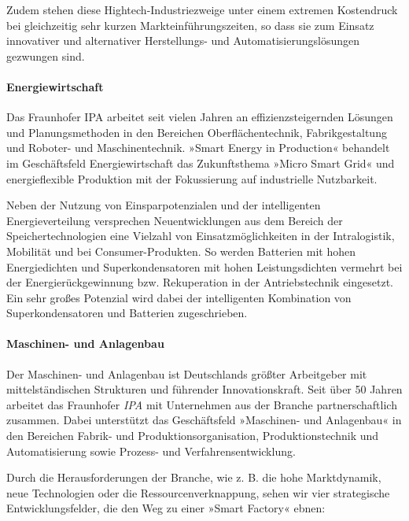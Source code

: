 Zudem stehen diese Hightech-Industriezweige unter einem extremen Kostendruck bei gleichzeitig sehr kurzen Markteinführungszeiten, so dass sie zum Einsatz innovativer und alternativer
Herstellungs- und Automatisierungslösungen gezwungen sind.
\paragraph{Energiewirtschaft}
Das Fraunhofer IPA arbeitet seit vielen Jahren an effizienzsteigernden Lösungen und Planungsmethoden in den Bereichen Oberflächentechnik, Fabrikgestaltung und Roboter- und Maschinentechnik.
»Smart Energy in Production« behandelt im Geschäftsfeld Energiewirtschaft das Zukunftsthema »Micro Smart Grid« und energieflexible Produktion mit der Fokussierung auf industrielle Nutzbarkeit.

Neben der Nutzung von Einsparpotenzialen und der intelligenten Energieverteilung versprechen Neuentwicklungen aus dem Bereich der Speichertechnologien eine Vielzahl von Einsatzmöglichkeiten
in der Intralogistik, Mobilität und bei Consumer-Produkten. So werden Batterien mit hohen Energiedichten und Superkondensatoren mit hohen Leistungsdichten vermehrt bei der Energierückgewinnung
bzw. Rekuperation in der Antriebstechnik eingesetzt. Ein sehr großes Potenzial wird dabei der intelligenten Kombination von Superkondensatoren und Batterien zugeschrieben.
\paragraph{Maschinen- und Anlagenbau}
Der Maschinen- und Anlagenbau ist Deutschlands größter Arbeitgeber mit mittelständischen Strukturen und führender Innovationskraft.
Seit über 50 Jahren arbeitet das Fraunhofer \emph{IPA} mit Unternehmen aus der Branche partnerschaftlich zusammen. Dabei unterstützt das Geschäftsfeld »Maschinen- und Anlagenbau«
in den Bereichen Fabrik- und Produktionsorganisation, Produktionstechnik und Automatisierung sowie Prozess- und Verfahrensentwicklung.

Durch die Herausforderungen der Branche, wie z. B. die hohe Marktdynamik, neue Technologien oder die Ressourcenverknappung, sehen wir vier strategische Entwicklungsfelder,
die den Weg zu einer »Smart Factory« ebnen:

